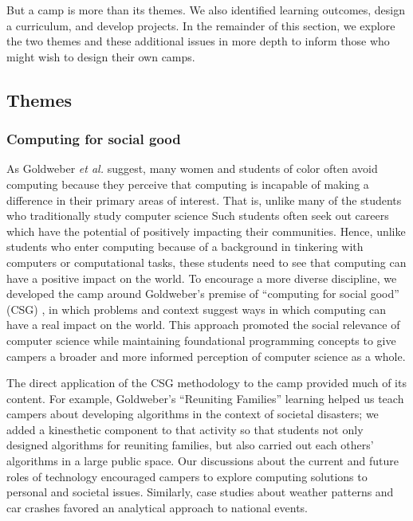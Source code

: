 But a camp is more than its themes.  We also identified learning
outcomes, design a curriculum, and develop projects.  In the remainder
of this section, we explore the two themes and these additional
issues in more depth to inform those who might wish to design their
own camps.

\subsection{Themes}

\subsubsection{Computing for social good}

As Goldweber \textit{et al.} \cite{Goldweber2013} suggest, many women
and students of color often avoid computing because they perceive
that computing is incapable of making a difference in their primary
areas of interest.  That is, unlike many of the students who
traditionally study computer science Such students often seek out
careers which have the potential of positively impacting their
communities.  Hence, unlike students who enter computing because
of a background in tinkering with computers or computational tasks,
these students need to see that computing can have a positive impact
on the world.  To encourage a more diverse discipline, we developed
the camp around Goldweber's premise of ``computing for social good''
(CSG) \cite{Goldweber2015}, in which problems and context suggest ways
in which computing can have a real impact on the world.  This
approach promoted the social relevance of computer science while
maintaining foundational programming concepts to give campers a
broader and more informed perception of computer science as a whole.

The direct application of the CSG methodology to the camp provided
much of its content. For example, Goldweber's ``Reuniting Families''
learning helped us teach campers about developing algorithms in the
context of societal disasters; we added a kinesthetic component to
that activity so that students not only designed algorithms for
reuniting families, but also carried out each others' algorithms
in a large public space.  Our discussions about the current and
future roles of technology encouraged campers to explore computing
solutions to personal and societal issues.  Similarly, case studies
about weather patterns and car crashes favored an analytical approach
to national events.


